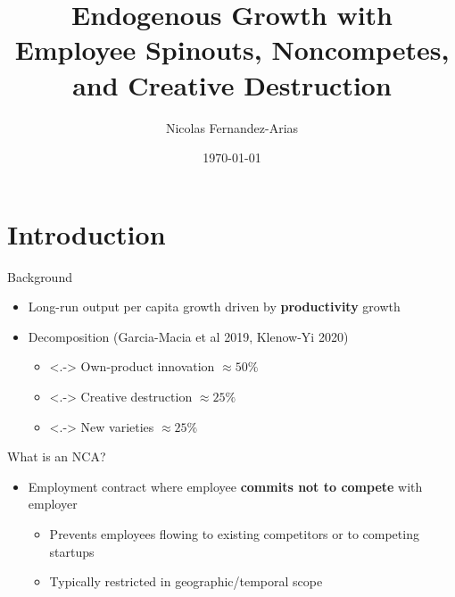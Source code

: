 \documentclass[english,usenames,dvipsnames]{beamer}
\title{Endogenous Growth with Employee Spinouts, Noncompetes, and Creative Destruction}
\author{Nicolas Fernandez-Arias}
\date{\today }
\begin{document}
\maketitle

\section{Introduction}


\begin{frame}{Background}\label{motivation_background}
	\begin{itemize}
		\item<+-> Long-run output per capita growth driven by \alert{\textbf{productivity}} growth \hyperlink{economic_growth_facts}{}
		\medskip
		\item<+-> Decomposition (Garcia-Macia et al 2019, Klenow-Yi 2020)
		\begin{itemize}
			\item<.-> Own-product innovation $\approx 50\%$
			\item<.-> Creative destruction $\approx 25\%$
			\item<.-> New varieties $\approx 25\%$
		\end{itemize}
	\end{itemize}
\end{frame}

\begin{frame}{What is an NCA?}\label{motivation_background}
	\begin{itemize}
		\item<+-> Employment contract where employee \alert{\textbf{commits not to compete}} with employer
		\begin{itemize}
			\item Prevents employees flowing to existing competitors or to competing startups
			\item Typically restricted in geographic/temporal scope
		\end{itemize}
	\end{itemize}
\end{frame}
\end{document}
